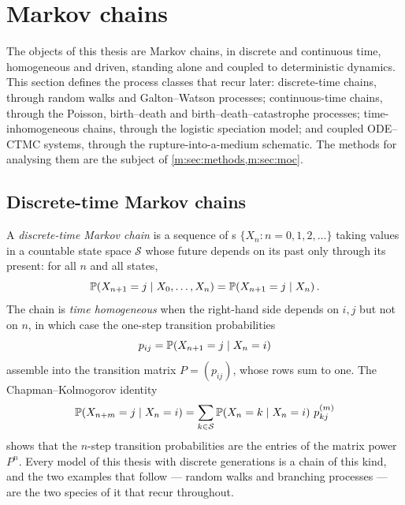 
\section{Markov chains}
\label{m:sec:markov}

The objects of this thesis are Markov chains, in discrete and continuous time,
homogeneous and driven, standing alone and coupled to deterministic dynamics.
This section defines the process classes that recur later: discrete-time chains,
through random walks and Galton--Watson processes; continuous-time chains,
through the Poisson, birth--death and birth--death--catastrophe processes;
time-inhomogeneous chains, through the logistic speciation model; and coupled
ODE--CTMC systems, through the rupture-into-a-medium schematic. The methods for
analysing them are the subject of \cref{m:sec:methods,m:sec:moc}.

\subsection{Discrete-time Markov chains}
\label{m:sec:dtmc}

A \emph{discrete-time Markov chain} is a sequence of \rv s
$\{X_n : n=0,1,2,\dots\}$ taking values in a countable state space
$\mathcal S$ whose future depends on its past only through its present: for all
$n$ and all states,
\begin{equation}
\label{m:eq:dtmcmarkov}
\mathbb{P}\!\left(X_{n+1} = j \mid X_0,\dots,X_n\right) = \mathbb{P}\!\left(X_{n+1}=j\mid X_n\right) .
\end{equation}
The chain is \emph{time homogeneous} when the right-hand side depends on $i,j$
but not on $n$, in which case the one-step transition probabilities
\begin{equation*}
p_{ij} = \mathbb{P}\!\left(X_{n+1}=j\mid X_n=i\right)
\end{equation*}
assemble into the transition matrix $P = (p_{ij})$, whose rows sum to one. The
Chapman--Kolmogorov identity
\begin{equation*}
\mathbb{P}\!\left(X_{n+m}=j\mid X_n=i\right) = \sum_{k\in\mathcal S}\mathbb{P}\!\left(X_n=k\mid X_n=i\right)\,p_{kj}^{(m)}
\end{equation*}
shows that the $n$-step transition probabilities are the entries of the matrix
power $P^n$. Every model of this thesis with discrete generations is a chain of
this kind, and the two examples that follow --- random walks and branching
processes --- are the two species of it that recur throughout.

